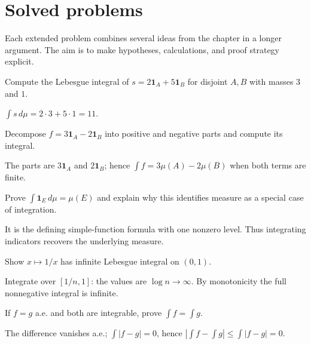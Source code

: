 \section{Solved problems}
Each extended problem combines several ideas from the chapter in a longer argument. The aim is to make hypotheses, calculations, and proof strategy explicit.

\begin{problem}\label{prob:iii03-problem-01}
Compute the Lebesgue integral of \(s=2\mathbf1_A+5\mathbf1_B\) for disjoint \(A,B\) with masses \(3\) and \(1\).
\end{problem}
\begin{solution}
\(\int s\,d\mu=2\cdot3+5\cdot1=11\).
\end{solution}

\begin{problem}\label{prob:iii03-problem-02}
Decompose \(f=3\mathbf1_A-2\mathbf1_B\) into positive and negative parts and compute its integral.
\end{problem}
\begin{solution}
The parts are \(3\mathbf1_A\) and \(2\mathbf1_B\); hence
\(\int f=3\mu(A)-2\mu(B)\) when both terms are finite.
\end{solution}

\begin{problem}\label{prob:iii03-problem-03}
Prove \(\int\mathbf1_E\,d\mu=\mu(E)\) and explain why this identifies measure as a special case of integration.
\end{problem}
\begin{solution}
It is the defining simple-function formula with one nonzero level. Thus
integrating indicators recovers the underlying measure.
\end{solution}

\begin{problem}\label{prob:iii03-problem-04}
Show \(x\mapsto1/x\) has infinite Lebesgue integral on \((0,1)\).
\end{problem}
\begin{solution}
Integrate over \([1/n,1]\): the values are \(\log n\to\infty\). By
monotonicity the full nonnegative integral is infinite.
\end{solution}

\begin{problem}\label{prob:iii03-problem-05}
If \(f=g\) a.e. and both are integrable, prove \(\int f=\int g\).
\end{problem}
\begin{solution}
The difference vanishes a.e.; \(\int|f-g|=0\), hence
\(|\int f-\int g|\le\int|f-g|=0\).
\end{solution}

